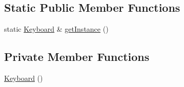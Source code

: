 \subsection*{Static Public Member Functions}
\begin{DoxyCompactItemize}
\item 
static \hyperlink{class_keyboard}{Keyboard} \& \hyperlink{class_keyboard_a09fc76a431abc21dba175b10bc4a1ec8}{get\-Instance} ()
\end{DoxyCompactItemize}
\subsection*{Private Member Functions}
\begin{DoxyCompactItemize}
\item 
\hyperlink{class_keyboard_ad6b0bb849d6bb7cdf63091e40b5f5f7f}{Keyboard} ()
\end{DoxyCompactItemize}

